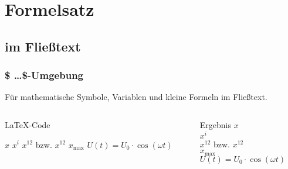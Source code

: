\section{Formelsatz}
\subsection{im Fließtext}
\begin{frame}[fragile]
   \frametitle{\$ \dots \$-Umgebung}
   Für mathematische Symbole, Variablen und kleine Formeln im Fließtext. 

    \begin{columns}[T]
        \begin{column}{0.6\textwidth}
            \begin{block}{\LaTeX-Code}
                \begin{lstverbatim}
                $x$ 
                $x^i$
                $x^12$ bzw. $x^{12}$ %
                $x_\mathrm{max}$
                $U(t) = U_0 \cdot \cos(\omega t)$
                \end{lstverbatim}
            \end{block}
        \end{column}
        \begin{column}{0.35\textwidth}
            \begin{block}{Ergebnis}
                $x$  \\
                $x^i$ \\
                $x^12$ bzw. $x^{12}$ \\ 
                $x_\mathrm{max}$ \\
                $U(t) = U_0 \cdot \cos(\omega t)$
            \end{block}
        \end{column}
    \end{columns}
\end{frame}
